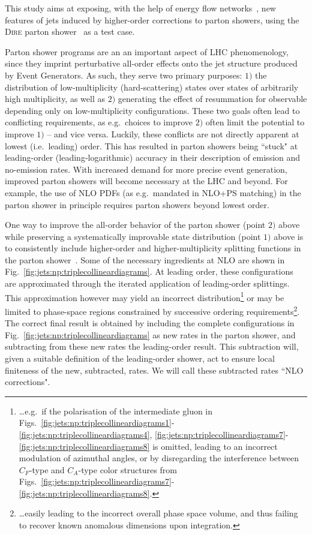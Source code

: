 
This study aims at exposing, with the help of energy flow 
networks~\cite{Komiske:2018cqr}, new features of jets induced by higher-order
corrections to parton showers, using the \textsc{Dire} parton shower~\cite{Hoche:2015sya}
as a test case.

Parton shower programs are an an important aspect
of LHC phenomenology, since they imprint perturbative all-order effects onto the
jet structure produced by Event Generators. As such, they serve two primary
purposes: $1)$ the distribution of low-multiplicity
(hard-scattering) states over states of arbitrarily high multiplicity, as well
as $2)$ generating the effect of resummation for observable depending only on 
low-multiplicity configurations. These two goals often lead to conflicting
requirements, as e.g.\ choices to improve
$2)$ often limit the potential to improve $1)$ -- and vice versa. Luckily,
these conflicts are not directly apparent at lowest (i.e.\ leading) order. This
has resulted in parton showers being ``stuck" at leading-order 
(leading-logarithmic) accuracy in their description of emission and 
no-emission rates. With increased demand for more precise event generation, 
improved parton showers will become necessary at the LHC and beyond. For 
example, the use of NLO PDFs (as e.g.\ mandated in NLO+PS
matching) in the parton shower in principle requires parton showers beyond
lowest order.

One way to improve the all-order behavior of the parton shower (point $2)$ 
above while preserving a systematically improvable state distribution (point $1)$ 
above is to consistently include higher-order and higher-multiplicity 
splitting functions in the parton 
shower~\cite{Li:2016yez, Hoche:2017iem,Dulat:2018vuy}. Some of the 
necessary ingredients at NLO are shown in 
Fig.~\ref{fig:jets:np:triplecollineardiagrams}. 
At leading order, these configurations are approximated through the iterated 
application of leading-order splittings. This approximation however may
yield an incorrect distribution\footnote{\dots e.g.\ if the polarisation of 
the intermediate gluon in 
Figs.~\ref{fig:jets:np:triplecollineardiagrams1}-\ref{fig:jets:np:triplecollineardiagrams4},
\ref{fig:jets:np:triplecollineardiagrams7}-\ref{fig:jets:np:triplecollineardiagrams8}
is omitted, leading to an incorrect modulation of azimuthal angles,
or by disregarding the interference between
$C_F$-type and $C_A$-type color structures from 
Figs.~\ref{fig:jets:np:triplecollineardiagrams7}-\ref{fig:jets:np:triplecollineardiagrams8}.}
or may be limited to phase-space regions constrained by successive 
ordering requirements\footnote{\dots easily leading to the 
incorrect overall phase space volume, and thus failing to recover known anomalous
dimensions upon integration.}.
The correct final result is obtained by including the 
complete configurations in Fig.~\ref{fig:jets:np:triplecollineardiagrams}
as new rates in the parton shower, and subtracting from these new rates
the leading-order result. This subtraction will, given a suitable definition
of the leading-order shower, act to ensure local finiteness of the new, 
subtracted, rates. We will call these subtracted rates ``NLO corrections".

